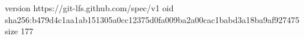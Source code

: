 version https://git-lfs.github.com/spec/v1
oid sha256:b479d4c1aa1ab151305a0cc12375d0fa009ba2a00cac1babd3a18ba9af927475
size 177
